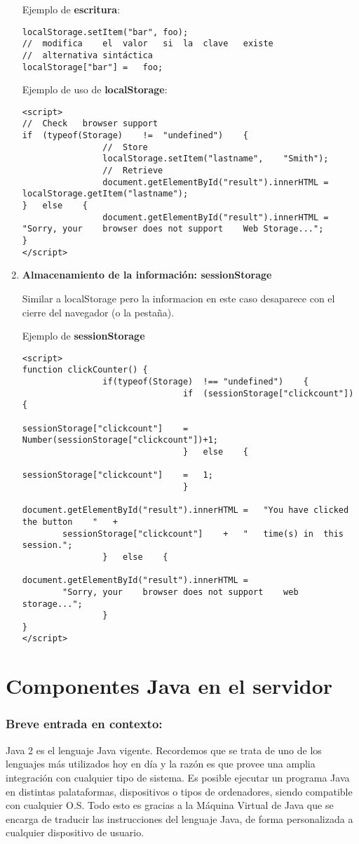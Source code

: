 \documentclass{apuntes}
\begin{document}
\begin{enumerate}
Ejemplo de \textbf{escritura}:
\begin{verbatim}
localStorage.setItem("bar",	foo);	
//	modifica	el	valor	si	la	clave	existe
//	alternativa sintáctica
localStorage["bar"]	=	foo;		
\end{verbatim}


Ejemplo de uso de \textbf{localStorage}:
\begin{verbatim}
<script>	
//	Check	browser	support
if	(typeof(Storage)	!=	"undefined")	{	
				//	Store
				localStorage.setItem("lastname",	"Smith");	
				//	Retrieve
				document.getElementById("result").innerHTML	=	
localStorage.getItem("lastname");	
}	else	{	
				document.getElementById("result").innerHTML	=		
"Sorry,	your	browser	does not support	Web	Storage...";	
}	
</script>
\end{verbatim}
	
\item \textbf{Almacenamiento de la información: sessionStorage}

Similar a localStorage pero la informacion en este caso desaparece con el cierre del navegador (o la pestaña).

Ejemplo de \textbf{ sessionStorage}
\begin{verbatim}
<script>	
function clickCounter()	{	
				if(typeof(Storage)	!==	"undefined")	{	
								if	(sessionStorage["clickcount"])	{	
												sessionStorage["clickcount"]	=	Number(sessionStorage["clickcount"])+1;	
								}	else	{	
												sessionStorage["clickcount"]	=	1;	
								}	
								document.getElementById("result").innerHTML	=	"You have clicked the button	"	+	
	 	sessionStorage["clickcount"]	+	"	time(s)	in	this session.";	
				}	else	{	
								document.getElementById("result").innerHTML	=		
	 	"Sorry,	your	browser	does not support	web	storage...";	
				}	
}	
</script>
\end{verbatim}	
\end{enumerate}

\section{Componentes Java en el servidor}
\subsubsection{Breve entrada en contexto: }
Java 2 es el lenguaje Java vigente. Recordemos que se trata de uno de los lenguajes más utilizados hoy en día y la razón es que provee una amplia integración con cualquier tipo de sistema. Es posible ejecutar un programa Java en distintas palataformas, dispositivos o tipos de ordenadores, siendo compatible con cualquier O.S. Todo esto es gracias a la Máquina Virtual de Java que se encarga de traducir las instrucciones del lenguaje Java, de forma personalizada a cualquier dispositivo de usuario. 
\end{document}
